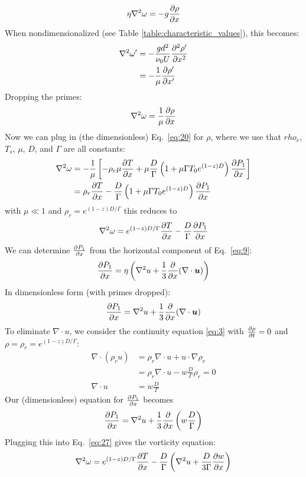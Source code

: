 \documentclass[document.tex]{subfiles}
\begin{document}
\begin{mdframed}
\begin{align*}
        \eta\nabla^2\omega = -g\pdv{\rho}{x}
    \end{align*}
    When nondimensionalized (see Table \ref{table:characteristic_values}), this becomes: 
    \begin{align*}
        \nabla^2\omega' &= -\frac{gd^2}{\nu_0U}\pdv[2]{\rho'}{x} \\
        &= -\frac{1}{\mu} \pdv{\rho'}{x'}
    \end{align*}
    Dropping the primes: 
    \begin{align*}
        \nabla^2\omega = \frac{1}{\mu}\pdv{\rho}{x}
    \end{align*}
    Now we can plug in (the dimensionless) Eq.~\eqref{eq:20} for $\rho$, where we use that $rho_r$, $T_s$, $\mu$, $D$, and $\Gamma$ are all constants: 
    \begin{align*}
            \nabla^2\omega &= -\frac{1}{\mu}\left[-\rho_r\mu\pdv{T}{x} + \mu \frac{D}{\Gamma}\left(1+\mu\Gamma T_0e^{(1-z)D}\right)\pdv{P_1}{x}\right] \\
            &= \rho_r\pdv{T}{x} -\frac{D}{\Gamma}\left(1+\mu\Gamma T_0e^{(1-z)D}\right)\pdv{P_1}{x}
    \end{align*}
    with $\mu \ll 1$ and $\rho_r = e^{(1-z)D/\Gamma}$ this reduces to 
    \begin{align} \label{eq:27}
        \nabla^2\omega = e^{(1-z)D/\Gamma}\pdv{T}{x}-\frac{D}{\Gamma}\pdv{P_1}{x}
    \end{align}
    We can determine $\pdv{P_1}{x}$ from the horizontal component of Eq.~\eqref{eq:9}: 
    \begin{align*}
        \pdv{P_1}{x} &= \eta \left(\nabla^2u+\frac{1}{3}\pdv{x}(\nabla \cdot \bm{u})\right) \\
    \end{align*} 
     In dimensionless form (with primes dropped): 
    \begin{align*}
        \pdv{P_1}{x} = \nabla^2u+\frac{1}{3}\pdv{x}(\nabla \cdot \bm{u})
    \end{align*}
    To eliminate $\nabla \cdot u$, we consider the continuity equation \eqref{eq:3} with $\pdv{\rho}{t} = 0$ and $\rho = \rho_r = e^{(1-z)D/\Gamma}$:
    \begin{align*}
        \nabla \cdot (\rho_r u) &= \rho_r\nabla \cdot u + u \cdot \nabla\rho_r \\
        &= \rho_r\nabla \cdot u - w \frac{D}{\Gamma} \rho_r = 0 \\
        \nabla \cdot u &= w\frac{D}{\Gamma}
    \end{align*} 
    Our (dimensionless) equation for $\pdv{P_1}{x}$ becomes
    \begin{align*}
        \pdv{P_1}{x} = \nabla^2u+\frac{1}{3}\pdv{x}\left(w\frac{D}{\Gamma}\right)
    \end{align*}
    Plugging this into Eq.~\eqref{eq:27} gives the vorticity equation: 
    \begin{align}
        \nabla^2\omega = e^{(1-z)D/\Gamma}\pdv{T}{x}-\frac{D}{\Gamma}\left(\nabla^2u+\frac{D}{3\Gamma}\pdv{w}{x}\right)
    \end{align}
\end{mdframed}
\end{document}
